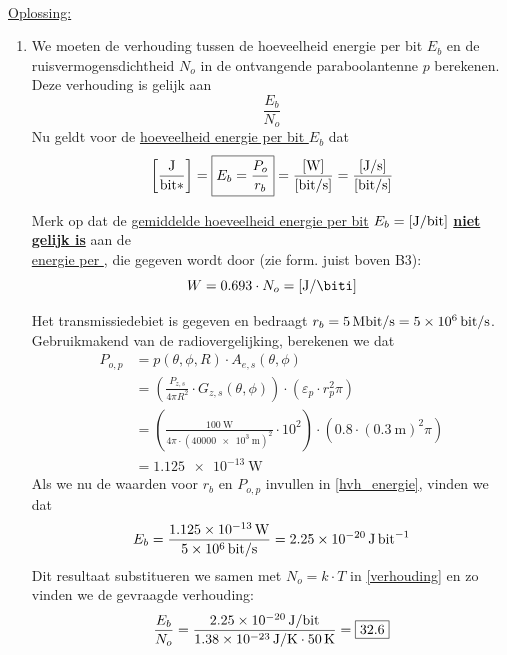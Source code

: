 \documentclass[kulak]{kulakarticle}
\let\epsilon\varepsilon
\begin{document}
	\hfill \\
	\underline{Oplossing:}
	\begin{enumerate}
		\item We moeten de verhouding tussen de hoeveelheid energie per bit \(E_b\) en de ruisvermogensdichtheid \(N_o\) in de ontvangende paraboolantenne \(p\) berekenen. Deze verhouding is gelijk aan \begin{equation}
			\frac{E_b}{N_o} \label{verhouding}
		\end{equation} Nu geldt voor de \underline{hoeveelheid energie per bit \(E_b\)} dat \begin{equation}
			\left[\frac{\unit{\joule}}{\unit{\bit*}}\right] = \boxed{E_b = \frac{P_o}{r_b}} = \frac{[\unit{\watt}]}{[\unit{\bit/\second}]} = \frac{[\unit{\joule/\second}]}{[\unit{bit/\second}]} \label{hvh_energie}
		\end{equation}

		Merk op dat de \underline{gemiddelde hoeveelheid energie per bit} \(E_b = [\unit{\joule/\bit}]\) \underline{\textbf{niet gelijk is}} aan de \\\underline{energie per \unit{\biti}}, die gegeven wordt door (zie form. juist boven B3): \[W=0.693 \cdot N_o = \left[\unit{\joule\per\biti}\right]\]

		Het transmissiedebiet is gegeven en bedraagt \(r_b=\SI{5}{\mega\bit/\second}=\SI{5e6}{\bit/\second}\).\\ Gebruikmakend van de radiovergelijking, berekenen we dat \begin{align*}
			P_{o,p} &= p(\theta,\phi,R) \cdot A_{e,s}(\theta,\phi) \\
			&= \left(\frac{P_{z,s}}{4\pi R^2} \cdot G_{z,s}(\theta,\phi) \right) \cdot \left( \epsilon_p \cdot r_p^2 \pi \right) \\
			&= \left(\frac{\SI{100}{\watt}}{4\pi \cdot (\SI{40000e3}{\meter})^2} \cdot 10^2 \right) \cdot \left( 0.8 \cdot (\SI{0.3}{\meter})^2 \pi \right) \\
			&= \SI{1.125e-13}{\watt}
		\end{align*}
		Als we nu de waarden voor \(r_b\) en \(P_{o,p}\) invullen in \eqref{hvh_energie}, vinden we dat \begin{equation*}
			E_b = \frac{\SI{1.125e-13}{\watt}}{\SI{5e6}{\bit/\second}} = \SI{2.25e-20}{\joule\per\bit}
		\end{equation*} Dit resultaat substitueren we samen met \(N_o = k\cdot T \) in \eqref{verhouding} en zo vinden we de gevraagde verhouding: \begin{equation*}
		\frac{E_b}{N_o} = \frac{\SI{2.25e-20}{\joule/\bit}}{\SI{1.38e-23}{\joule/\kelvin}\cdot\SI{50}{\kelvin}} = \boxed{32.6}
		\end{equation*}


\end{enumerate}
\end{document}

